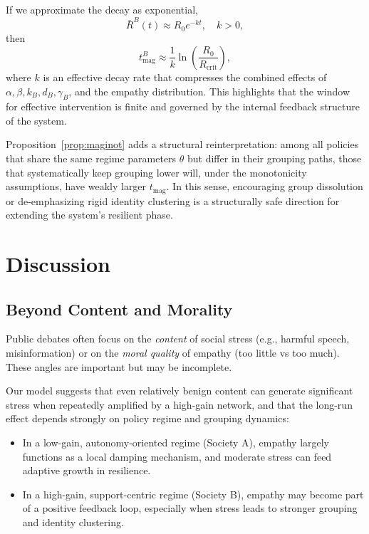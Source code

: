 \documentclass[11pt]{article}
\theoremstyle{plain}
\begin{document}
If we approximate the decay as exponential,
\[
\bar{R}^B(t) \approx R_0 e^{-kt}, \quad k>0,
\]
then
\begin{equation}
t_{\text{mag}}^B \approx \frac{1}{k} \ln\left(\frac{R_0}{R_{\text{crit}}}\right),
\end{equation}
where $k$ is an effective decay rate that compresses the combined effects of $\alpha, \beta, k_B, d_B, \gamma_B$, and the empathy distribution.
This highlights that the window for effective intervention is finite and governed by the internal feedback structure of the system.

Proposition~\ref{prop:maginot} adds a structural reinterpretation: among all policies that share the same regime parameters $\theta$ but differ in their grouping paths, those that systematically keep grouping lower will, under the monotonicity assumptions, have weakly larger $t_{\text{mag}}$.
In this sense, encouraging group dissolution or de-emphasizing rigid identity clustering is a structurally safe direction for extending the system's resilient phase.

\section{Discussion}

\subsection{Beyond Content and Morality}

Public debates often focus on the \emph{content} of social stress (e.g., harmful speech, misinformation) or on the \emph{moral quality} of empathy (too little vs too much).
These angles are important but may be incomplete.

Our model suggests that even relatively benign content can generate significant stress when repeatedly amplified by a high-gain network, and that the long-run effect depends strongly on policy regime and grouping dynamics:
\begin{itemize}
  \item In a low-gain, autonomy-oriented regime (Society A), empathy largely functions as a local damping mechanism, and moderate stress can feed adaptive growth in resilience.
  \item In a high-gain, support-centric regime (Society B), empathy may become part of a positive feedback loop, especially when stress leads to stronger grouping and identity clustering.
\end{itemize}
\end{document}
